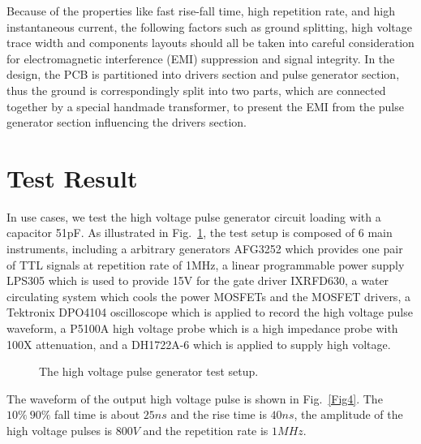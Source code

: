 \documentclass[aip,rsi,reprint,graphicx]{revtex4-1} %
\begin{document}
Because of the properties like fast rise-fall time, high repetition rate, and high instantaneous current, the following factors  such as ground splitting, high voltage trace width and components layouts should all be taken into careful consideration for electromagnetic interference (EMI) suppression and signal integrity.
In the design, the PCB is partitioned into drivers section and pulse generator section, thus the ground is correspondingly split into two parts, which are connected together by a special handmade transformer, to present the EMI from the pulse generator section influencing the drivers section.

\section{Test Result}
In use cases, we test the high voltage pulse generator circuit loading with a capacitor 51pF.  As illustrated in Fig.~\ref{FIG3}, the test setup is composed of 6 main instruments, including a arbitrary generators AFG3252 which provides one pair of  TTL signals at repetition rate of 1MHz, a  linear programmable power supply LPS305 which is used to provide 15V for the gate driver IXRFD630, a water circulating system which cools the power MOSFETs and the MOSFET drivers,  
a Tektronix DPO4104 oscilloscope which is applied to record the high voltage pulse waveform, a P5100A high voltage probe which is a high impedance probe with 100X attenuation, and a DH1722A-6 which is applied to supply high voltage.

\begin{figure}
\caption{The high voltage pulse generator test setup. \label{FIG3}}%
\end{figure}

The waveform of the output high voltage pulse is shown in Fig.~\ref{Fig4}. The $10\%~90\%$ fall time is about $25ns$ and the rise time is $40 ns$, the amplitude of the high voltage pulses is $800V$ and the repetition rate is $1MHz$.
\end{document}
